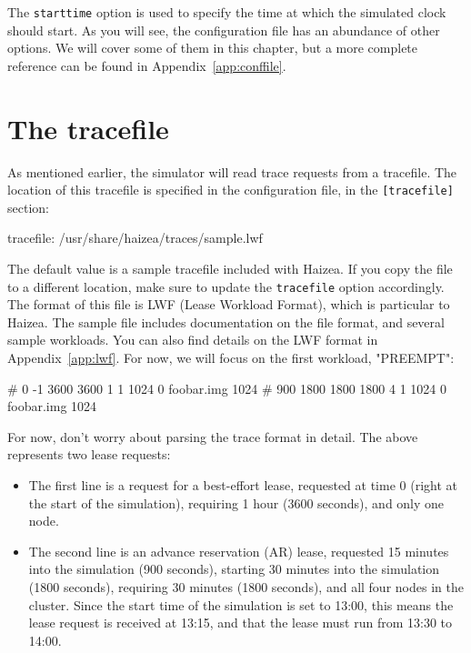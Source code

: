 The \texttt{starttime} option is used to specify the time at which the simulated clock should start. As you will see, the configuration file has an abundance of other options. We will cover some of them in this chapter, but a more complete reference can be found in Appendix~\ref{app:conffile}.

\section{The tracefile}

As mentioned earlier, the simulator will read trace requests from a tracefile. The location of this tracefile is specified in the configuration file, in the \texttt{[tracefile]} section:

\begin{wideshellverbatim}
[tracefile]
tracefile: /usr/share/haizea/traces/sample.lwf 
\end{wideshellverbatim}

The default value is a sample tracefile included with Haizea. If you copy the file to a different location, make sure to update the \texttt{tracefile} option accordingly. The format of this file is LWF (Lease Workload Format), which is particular to Haizea. The sample file includes documentation on the file format, and several sample workloads. You can also find details on the LWF format in Appendix~\ref{app:lwf}. For now, we will focus on the first workload, "PREEMPT":

\begin{wideshellverbatim}
# 0   -1   3600 3600 1 1 1024 0 foobar.img 1024
# 900 1800 1800 1800 4 1 1024 0 foobar.img 1024
\end{wideshellverbatim}

For now, don't worry about parsing the trace format in detail. The above represents two lease requests:

\begin{itemize}
\item The first line is a request for a best-effort lease, requested at time 0 (right at the start of the simulation), requiring 1 hour (3600 seconds), and only one node.
\item The second line is an advance reservation (AR) lease, requested 15 minutes into the simulation (900 seconds), starting 30 minutes into the simulation (1800 seconds), requiring 30 minutes (1800 seconds), and all four nodes in the cluster. Since the start time of the simulation is set to 13:00, this means the lease request is received at 13:15, and that the lease must run from 13:30 to 14:00.
\end{itemize}

